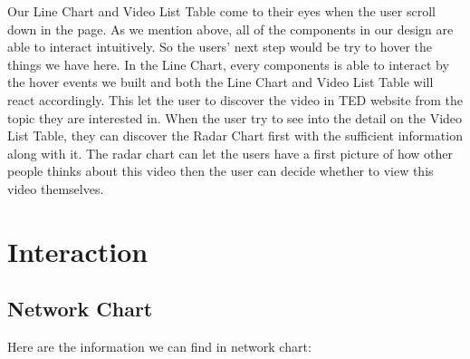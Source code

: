 \documentclass{report}
\numberwithin{figure}{section}
\begin{document}
Our Line Chart and Video List Table come to their eyes when the user scroll down in the page. As we mention above, all of the components in our design are able to interact intuitively. So the users' next step would be try to hover the things we have here. In the Line Chart, every components is able to interact by the hover events we built and both the Line Chart and Video List Table will react accordingly. This let the user to discover the video in TED website from the topic they are interested in. When the user try to see into the detail on the Video List Table, they can discover the Radar Chart first with the sufficient information along with it. The radar chart can let the users have a first picture of how other people thinks about this video then the user can decide whether to view this video themselves.

\section{Interaction}

\subsection{Network Chart}

\quad Here are the information we can find in network chart:
\end{document}
